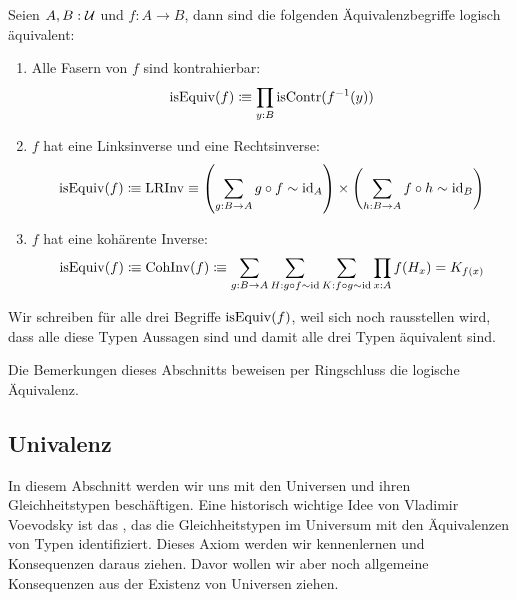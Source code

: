 \begin{theorem}
  \label{thm:aequivalenzen}
  Seien $A,B:\mathcal{U}$ und $f:A\to B$, dann sind die folgenden Äquivalenzbegriffe logisch äquivalent:
  \begin{enumerate}
  \item Alle Fasern von $f$ sind kontrahierbar:
    \[
      \mathrm{isEquiv}(f)\vcentcolon\mspace{-1.2mu}\equiv\prod_{y:B}\mathrm{isContr}(f^{-1}(y))
    \]
  \item $f$ hat eine Linksinverse und eine Rechtsinverse:
    \[
      \mathrm{isEquiv}(f)\vcentcolon\mspace{-1.2mu}\equiv\mathrm{LRInv}\equiv  \left(\sum_{g:B\to A}g\circ f\sim\mathrm{id}_A\right)\times\left(\sum_{h:B\to A}f\circ h\sim\mathrm{id}_B\right)
    \]
  \item $f$ hat eine kohärente Inverse:
    \[
      \mathrm{isEquiv}(f)\vcentcolon\mspace{-1.2mu}\equiv\mathrm{CohInv}(f)\vcentcolon\mspace{-1.2mu}\equiv \sum_{g:B\to A} \sum_{H:g\circ f\sim\mathrm{id}}\sum_{K:f\circ g\sim\mathrm{id}} \prod_{x:A}f(H_x)=K_{f(x)}
    \]
  \end{enumerate}
  Wir schreiben für alle drei Begriffe $\mathrm{isEquiv}(f)$, weil sich noch rausstellen wird, dass alle diese Typen Aussagen sind und damit alle drei Typen äquivalent sind.
\end{theorem}
\begin{beweis}
  Die Bemerkungen dieses Abschnitts beweisen per Ringschluss die logische Äquivalenz.
\end{beweis}

\subsection{Univalenz}
In diesem Abschnitt werden wir uns mit den Universen und ihren Gleichheitstypen beschäftigen.
Eine historisch wichtige Idee von Vladimir Voevodsky ist das ,
das die Gleichheitstypen im Universum mit den Äquivalenzen von Typen identifiziert.
Dieses Axiom werden wir kennenlernen und Konsequenzen daraus ziehen.
Davor wollen wir aber noch allgemeine Konsequenzen aus der Existenz von Universen ziehen.

